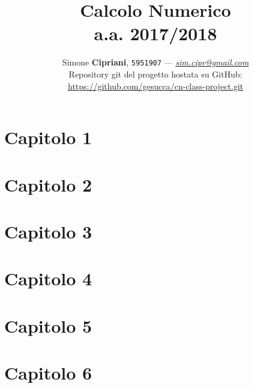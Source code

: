 \documentclass[a4paper, 12pt]{article}
\date{}
\begin{document}
\title{
	\vspace{3cm}
	\textbf{Calcolo Numerico}
	\\
	a.a. 2017/2018
	\vspace{1.5cm}
}

\author{
	Simone \textbf{Cipriani}, \texttt{5951907} --- \href{mailto:sim.cipr@gmail.com}{\textit{sim.cipr@gmail.com}}
	\vspace{1cm}
	\\
	Repository git del progetto hostata su GitHub:
	\\
	\url{https://github.com/gesucca/cn-class-project.git}
}

\maketitle
\newpage
\tableofcontents


\newpage
\section{\textbf{Capitolo 1}}


\newpage
\section{\textbf{Capitolo 2}}


\newpage
\section{\textbf{Capitolo 3}}


\newpage
\section{\textbf{Capitolo 4}}


\newpage
\section{\textbf{Capitolo 5}}


\newpage
\section{\textbf{Capitolo 6}}

\end{document}
